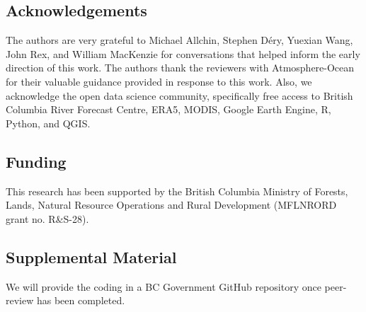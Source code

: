 \documentclass{tATO2e}
\begin{document}
\subsection{Acknowledgements}

The authors are very grateful to Michael Allchin, Stephen Déry, Yuexian Wang, John Rex, and William MacKenzie for conversations that helped inform the early direction of this work. The authors thank the reviewers with Atmosphere-Ocean for their valuable guidance provided in response to this work. Also, we acknowledge the open data science community, specifically free access to British Columbia River Forecast Centre, ERA5, MODIS, Google Earth Engine, R, Python, and QGIS. 

\subsection{Funding}

This research has been supported by the British Columbia Ministry of Forests, Lands, Natural Resource Operations and Rural Development (MFLNRORD grant no. R\&S-28).

\subsection{Supplemental Material}

We will provide the coding in a BC Government GitHub repository once peer-review has been completed. 



\end{document}
